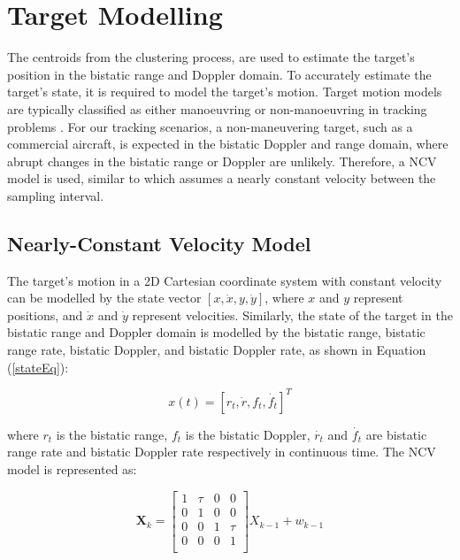 \newpage
\section{Target Modelling}

The centroids from the clustering process, are used to estimate the target's position in the bistatic range and Doppler domain. To accurately estimate the target's state, it is required to model the target's motion. Target motion models are typically classified as either manoeuvring or non-manoeuvring  in tracking problems \cite{Li2003a}. For our tracking scenarios, a non-maneuvering target, such as a commercial aircraft, is expected in the bistatic Doppler and range domain, where abrupt changes in the bistatic range or Doppler are unlikely. Therefore, a \ac{NCV} model is used, similar to \cite{Boyer2012} which assumes a nearly constant velocity between the sampling interval.

\subsection{Nearly-Constant Velocity Model}
The target's motion in a \ac{2D} Cartesian coordinate system with constant velocity can be modelled by the state vector \( [x, \dot{x}, y, \dot{y}] \), where \( x \) and \( y \) represent positions, and \( \dot{x} \) and \( \dot{y} \) represent velocities. Similarly, the state of the target in the bistatic range and Doppler domain is modelled by the bistatic range, bistatic range rate, bistatic Doppler, and bistatic Doppler rate, as shown in  Equation (\ref{stateEq}):

\begin{equation}
    x(t) = [r_t, \dot{r}, f_t, \dot{f_t}]^T
    \label{stateEq}
\end{equation}

where \(r_t\) is the bistatic range, \(f_t\) is the bistatic Doppler, \(\dot{r_t}\) and \(\dot{f_t}\) are bistatic range rate and bistatic Doppler rate respectively in continuous time. The \ac{NCV} model is represented as:

\begin{equation}
    \mathbf{X}_k = 
    \begin{bmatrix}
        1 & \tau & 0 & 0 \\
        0 & 1 & 0 & 0 \\
        0 & 0 & 1 & \tau \\
        0 & 0 & 0 & 1 \\
    \end{bmatrix} X_{k-1} + w_{k-1}
\end{equation}

